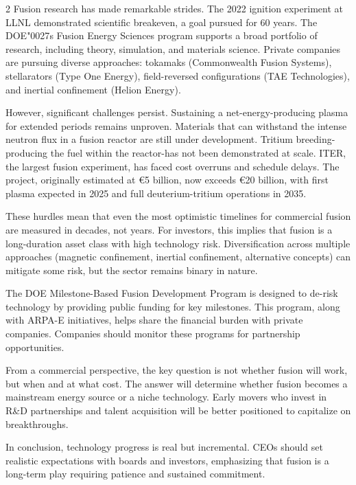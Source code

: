 \documentclass[10pt,a4paper]{article}
\newcommand{\BOApos}{{\BOQuoteFont\char"0027}}
\begin{document}
\begin{multicols}{2}
{\small Fusion research has made remarkable strides. The 2022 ignition experiment at LLNL demonstrated scientific breakeven, a goal pursued for 60 years. The DOE\BOApos{}s Fusion Energy Sciences program supports a broad portfolio of research, including theory, simulation, and materials science. Private companies are pursuing diverse approaches: tokamaks (Commonwealth Fusion Systems), stellarators (Type One Energy), field-reversed configurations (TAE Technologies), and inertial confinement (Helion Energy).}\par
{\small However, significant challenges persist. Sustaining a net-energy-producing plasma for extended periods remains unproven. Materials that can withstand the intense neutron flux in a fusion reactor are still under development. Tritium breeding-producing the fuel within the reactor-has not been demonstrated at scale. ITER, the largest fusion experiment, has faced cost overruns and schedule delays. The project, originally estimated at €5 billion, now exceeds €20 billion, with first plasma expected in 2025 and full deuterium-tritium operations in 2035.}\par
{\small These hurdles mean that even the most optimistic timelines for commercial fusion are measured in decades, not years. For investors, this implies that fusion is a long-duration asset class with high technology risk. Diversification across multiple approaches (magnetic confinement, inertial confinement, alternative concepts) can mitigate some risk, but the sector remains binary in nature.}\par
{\small The DOE Milestone-Based Fusion Development Program is designed to de-risk technology by providing public funding for key milestones. This program, along with ARPA-E initiatives, helps share the financial burden with private companies. Companies should monitor these programs for partnership opportunities.}\par
{\small From a commercial perspective, the key question is not whether fusion will work, but when and at what cost. The answer will determine whether fusion becomes a mainstream energy source or a niche technology. Early movers who invest in R\&D partnerships and talent acquisition will be better positioned to capitalize on breakthroughs.}\par
{\small In conclusion, technology progress is real but incremental. CEOs should set realistic expectations with boards and investors, emphasizing that fusion is a long-term play requiring patience and sustained commitment.}\par
\end{multicols}
\label{chap:2:end}
\end{document}
